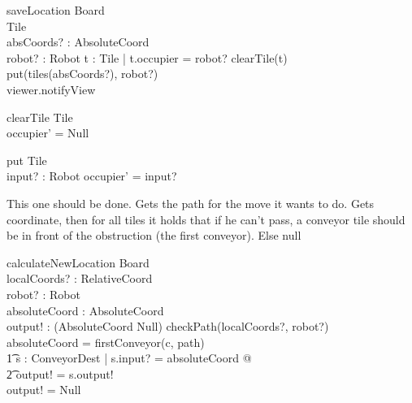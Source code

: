 \documentclass[a4paper,11pt]{article}
\begin{document}
\begin{schema}{saveLocation}
\Xi Board \\
\Delta Tile \\
absCoords? : AbsoluteCoord \\
robot? : Robot
\where
\exists t : Tile | t.occupier = robot? \implies clearTile(t)\\
put(tiles(absCoords?), robot?) \\
viewer.notifyView
\end{schema}

\begin{schema}{clearTile}
\Delta Tile \\
\where
occupier' = Null
\end{schema}

\begin{schema}{put}
\Delta Tile \\
input? : Robot
\where
occupier' = input?
\end{schema}

This one should be done. Gets the path for the move it wants to do. Gets coordinate, then for all tiles it holds that if he can't pass, a conveyor tile should be in front of the obstruction (the first conveyor). Else null
\begin{schema}{calculateNewLocation}
\Xi Board \\
localCoords? : RelativeCoord \\
robot? : Robot \\
absoluteCoord : AbsoluteCoord \\
output! : (AbsoluteCoord \union Null) 
\where
\IF checkPath(localCoords?, robot?) \\
\THEN absoluteCoord = firstConveyor(c, path) \\ \t1
\exists s : ConveyorDest | s.input? = absoluteCoord @ \\ \t2
output! = s.output! \\
\ELSE output! = Null
\end{schema}
\end{document}
